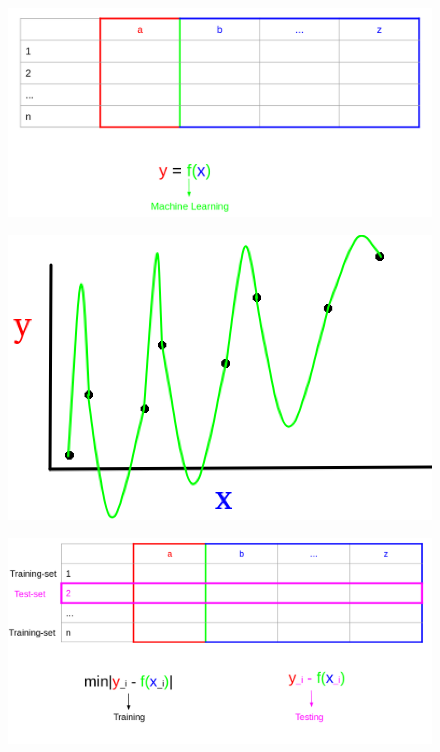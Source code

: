 \documentclass{beamer}
\begin{document}
\begin{frame}
 \begin{figure}[ht!]
 \centering
 \includegraphics[scale=0.3]{table2.png}
\end{figure}
\end{frame}

\begin{frame}
\begin{figure}[ht!]
 \centering
 \includegraphics[scale=0.3]{f1.png}
\end{figure}
\end{frame}

\begin{frame}
 \begin{figure}[ht!]
 \centering
 \includegraphics[scale=0.3]{table3.png}
\end{figure}
\end{frame}
\end{document}
